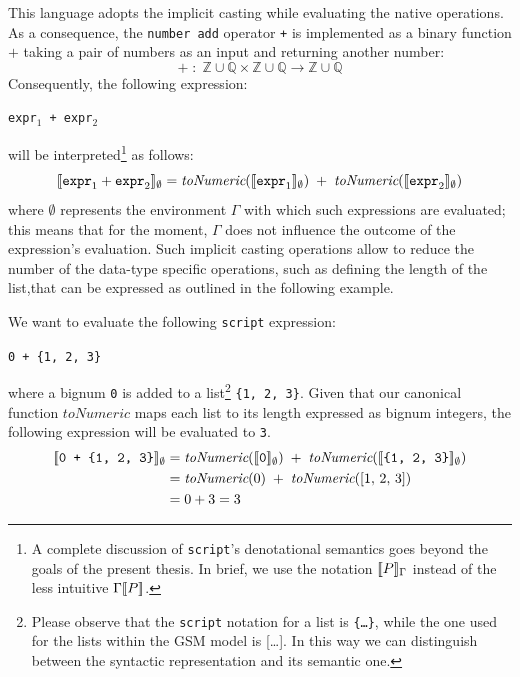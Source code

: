 This language adopts the implicit casting while evaluating the native operations. As a consequence, the \texttt{number add} operator \texttt{+} is implemented as a binary function $+$ taking a pair of numbers as an input and returning another number:
\[+\;\colon\;\mathbb{Z}\cup\mathbb{Q}\times \mathbb{Z}\cup\mathbb{Q}\to \mathbb{Z}\cup\mathbb{Q}\]
Consequently, the following expression:
\begin{center}
	\texttt{expr$_1$ + expr$_2$}
\end{center}
will be interpreted\footnote{A complete discussion of \texttt{script}'s denotational semantics \cite{Nielson92} goes beyond the goals of the present thesis. In brief, we use the notation $[\! [P]\!]_\Gamma$ instead of the less intuitive $\Gamma[\! [P]\!]$.} as follows:
\[[\! [\texttt{expr}_1 + \texttt{expr}_2]\!]_\emptyset=\textit{toNumeric}([\! [\texttt{expr}_1]\!]_\emptyset)\;+\;\textit{toNumeric}([\! [\texttt{expr}_2]\!]_\emptyset)\]
where $\emptyset$ represents the environment $\Gamma$ with which such expressions are evaluated; this means that for the moment, $\Gamma$ does not influence the outcome of the expression's evaluation. Such implicit casting operations allow to reduce the number of the  data-type specific operations, such as defining the length of the list,that can be expressed as outlined in the following example.
\begin{example}
	We want to evaluate the following \texttt{script} expression:
	\begin{center}
		\texttt{0 + \{1, 2, 3\}}
	\end{center}
	where a bignum \texttt{0} is added to a list\footnote{Please observe that the \texttt{script} notation for a list is \texttt{\{\dots\}}, while the one used for the lists within the GSM model is [\dots]. In this way we can distinguish between the syntactic representation and its semantic one.} \texttt{\{1, 2, 3\}}. Given that our canonical function $toNumeric$ maps each list to its length expressed as bignum integers,
	the following expression will be evaluated to \texttt{3}.
	\[\begin{split}
	[\! [\texttt{0 + \{1, 2, 3\}}]\!]_\emptyset&=\textit{toNumeric}([\! [\texttt{0}]\!]_\emptyset)\;+\;\textit{toNumeric}([\! [\texttt{\{1, 2, 3\}}]\!]_\emptyset)\\
	&=\textit{toNumeric}(0)\;+\;\textit{toNumeric}([1,\, 2,\, 3])\\
	&=0+3=3
	\end{split}\]
\end{example}


